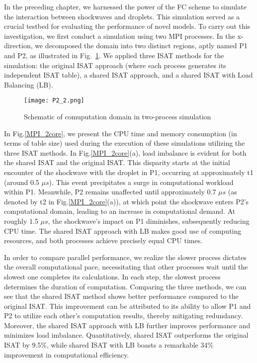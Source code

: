 In the preceding chapter, we harnessed the power of the FC scheme to simulate the interaction between shockwaves and droplets. This simulation served as a crucial testbed for evaluating the performance of novel models. To carry out this investigation, we first conduct a simulation using two MPI processes. In the x-direction, we decomposed the domain into two distinct regions, aptly named P1 and P2, as illustrated in Fig.~\ref{MPI_P2}. We applied three ISAT methods for the simulation: the original ISAT approach (where each process generates its independent ISAT table), a shared ISAT approach, and a shared ISAT with Load Balancing (LB).
\begin{figure}[htbp]
	\centering
	\texttt{[image: P2\_2.png]}
	\caption{Schematic of comuputation domain in  two-process simulation}
	\label{MPI_P2}
\end{figure}



In Fig.\ref{MPI_2core}, we present the CPU time and memory consumption (in terms of table size) used during the execution of these simulations utilizing the three ISAT methods. In Fig.\ref{MPI_2core}(a), load imbalance is evident for both the shared ISAT and the original ISAT. This disparity starts at the initial encounter of the shockwave with the droplet in P1, occurring at approximately t1 (around 0.5 $\mu s$). This event precipitates a surge in computational workload within P1. Meanwhile, P2 remains unaffected until approximately 0.7 $\mu s$ (as denoted by t2 in Fig.\ref{MPI_2core}(a)), at which point the shockwave enters P2's computational domain, leading to an increase in computational demand. At roughly 1.5 $\mu s$, the shockwave's impact on P1 diminishes, subsequently reducing CPU time. The shared ISAT approach with LB makes good use of computing resources, and both processes achieve precisely equal CPU times.

In order to compare parallel performance, we realize the slower process dictates the overall computational pace, necessitating that other processes wait until the slowest one completes its calculations. In each step, the slowest process determines the duration of computation. Comparing the three methods, we can see that the shared ISAT method shows better performance compared to the original ISAT. This improvement can be attributed to its ability to allow P1 and P2 to utilize each other's computation results, thereby mitigating redundancy. Moreover, the shared ISAT approach with LB further improves performance and minimizes load imbalance. Quantitatively, shared ISAT outperforms the original ISAT by 9.5\%, while shared ISAT with LB boasts a remarkable 34\% improvement in computational efficiency.



